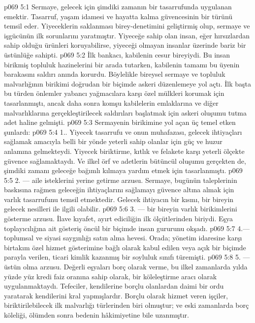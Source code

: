 \vs p069 5:1 Sermaye, gelecek için şimdiki zamanın bir tasarrufunda uygulanan emektir. Tasarruf, yaşam idamesi ve hayatta kalma güvencesinin bir türünü temsil eder. Yiyeceklerin saklanması birey\hyp{}denetimini geliştirmiş olup, sermaye ve işgücünün ilk sorunlarını yaratmıştır. Yiyeceğe sahip olan insan, eğer hırsızlardan sahip olduğu ürünleri koruyabilirse, yiyeceği olmayan insanlar üzerinde bariz bir üstünlüğe sahipti.
\vs p069 5:2 İlk bankacı, kabilenin cesur bireyiydi. Bu insan birikmiş topluluk hazinelerini bir arada tutarken, kabilenin tamamı bu üyenin barakasını saldırı anında korurdu. Böylelikle bireysel sermaye ve topluluk malvarlığının birikimi doğrudan bir biçimde askeri düzenlemeye yol açtı. İlk başta bu türden önlemler yabancı yağmacılara karşı özel mülkleri korumak için tasarlanmıştı, ancak daha sonra komşu kabilelerin emlaklarına ve diğer malvarlıklarına gerçekleştirilecek saldırıları başlatmak için askeri oluşumu tutma adet haline gelmişti.
\vs p069 5:3 Sermayenin birikimine yol açan üç temel etken şunlardı:
\vs p069 5:4 1.\bibnobreakspace {}. Yiyecek tasarrufu ve onun muhafazası, gelecek ihtiyaçları sağlamak amacıyla belli bir yönde yeterli  sahip olanlar için güç ve huzur anlamına gelmekteydi. Yiyecek biriktirme, kıtlık ve felakete karşı yeterli ölçekte güvence sağlamaktaydı. Ve ilkel örf ve adetlerin bütüncül oluşumu gerçekten de, şimdiki zamanı geleceğe bağımlı kılmaya yardım etmek için tasarlanmıştı.
\vs p069 5:5 2.\bibnobreakspace {} --- aile isteklerini yerine getirme arzusu. Sermaye, bugünün taleplerinin baskısına rağmen geleceğin ihtiyaçlarını sağlamayı güvence altına almak için varlık tasarrufunu temsil etmektedir. Gelecek ihtiyacın bir kısmı, bir bireyin gelecek nesilleri ile ilgili olabilir.
\vs p069 5:6 3.\bibnobreakspace {} --- bir bireyin varlık birikimlerini gösterme arzusu. İlave kıyafet, ayırt ediciliğin ilk ölçütlerinden biriydi. Eşya toplayıcılığına ait gösteriş öncül bir biçimde insan gururunu okşadı.
\vs p069 5:7 4.\bibnobreakspace {}--- toplumsal ve siyasi saygınlığı satın alma hevesi. Orada; yönetim idaresine karşı birtakım özel hizmet gösterimine bağlı olarak kabul edilen veya açık bir biçimde parayla verilen, ticari kimlik kazanmış bir soyluluk sınıfı türemişti.
\vs p069 5:8 5.\bibnobreakspace {} --- üstün olma arzusu. Değerli eşyaları borç olarak verme, bu ilkel zamanlarda yılda yüzde yüz kredi faiz oranına sahip olarak, bir köleleştirme aracı olarak uygulanmaktaydı. Tefeciler, kendilerine borçlu olanlardan daimi bir ordu yaratarak kendilerini kral yapmışlardır. Borçlu olarak hizmet veren işçiler, biriktirilebilecek ilk malvarlığı türlerinden biri olmuştur; ve eski zamanlarda borç köleliği, ölümden sonra bedenin hâkimiyetine bile uzanmıştır.
